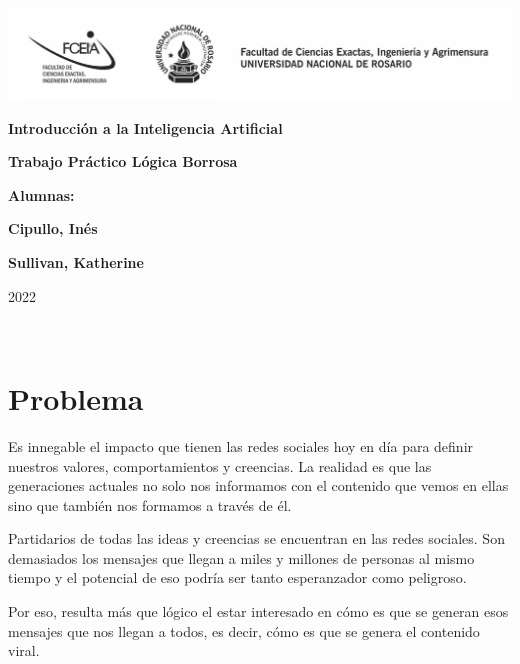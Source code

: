 \documentclass{article}
\begin{document}
\begin{titlepage}
    \hspace{-2.5cm}\includegraphics[scale= 0.48]{header.png}
    \begin{center}
        \vfill
            \noindent\textbf{\Huge Introducción a la Inteligencia Artificial}\par
            \vspace{.5cm}
            \noindent\textbf{\Huge Trabajo Práctico Lógica Borrosa}\par
            \vspace{.5cm}
        \vfill
        \noindent \textbf{\huge Alumnas:}\par
        \vspace{.5cm}
        \noindent \textbf{\Large Cipullo, Inés}\par
        \noindent \textbf{\Large Sullivan, Katherine}\par
 
        \vfill
        \noindent\large 2022
    \end{center}
\end{titlepage}
\ 



\section{Problema}

Es innegable el impacto que tienen las redes sociales hoy en día para definir nuestros valores, 
comportamientos y creencias. La realidad es que las generaciones actuales no solo nos informamos
con el contenido que vemos en ellas sino que también nos formamos a través de él.

Partidarios de todas las ideas y creencias se encuentran en las redes sociales. Son demasiados
los mensajes que llegan a miles y millones de personas al mismo tiempo y el potencial de eso
podría ser tanto esperanzador como peligroso. 

Por eso, resulta más que lógico el estar interesado en cómo es que se generan esos mensajes que 
nos llegan a todos, es decir, cómo es que se genera el contenido viral.
\end{document}
